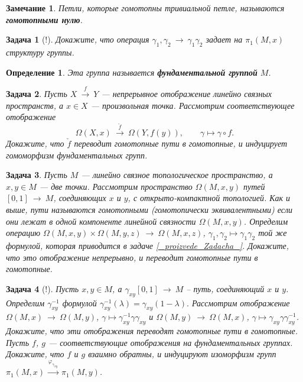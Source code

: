 \documentclass[12pt]{book}
\newcommand{\arrow}{{\:\longrightarrow\:}}
\renewcommand{\phi}{\varphi}
\theoremstyle{upshape}
\newtheorem{zadacha}{Задача}[chapter]
\theoremstyle{generic}
\newtheorem{opredelenie}[teorema]{Определение}
\theoremstyle{upshapenonumber}
\newtheorem{zamechanie}{Замечание}[chapter]
\newcommand{\следствие}{%
     \refstepcounter{teorema}
     {\noindent\bf Следствие \thechapter.\arabic{teorema}:\ }}
\newcommand{\пример}{%
     \refstepcounter{teorema}
     {\noindent\bf Пример \thechapter.\arabic{teorema}:\ }}
\newcommand{\лемма}{%
     \refstepcounter{teorema}
     {\noindent\bf Лемма \thechapter.\arabic{teorema}:\ }}
\newcommand{\теорема}{%
     \refstepcounter{teorema}
     {\noindent\bf Теорема \thechapter.\arabic{teorema}:\ }}
\newcommand{\утверждение}{%
     \refstepcounter{teorema}
     {\noindent\bf Утверждение \thechapter.\arabic{teorema}:\ }}
\begin{document}
{\begin{zamechanie}
Петли, которые гомотопны тривиальной петле, называются
{\bf гомотопными нулю}.
\end{zamechanie}

\begin{zadacha}[!]
Докажите, что операция $\gamma_1, \gamma_2\arrow \gamma_1\gamma_2$
задает на $\pi_1(M, x)$ структуру группы.
\end{zadacha}

\begin{opredelenie} 
Эта группа называется {\bf фундаментальной группой} $M$.
\end{opredelenie}

\begin{zadacha}
Пусть $X\stackrel f \arrow Y$ --- непрерывное отображение
линейно связных пространств,
а $x\in X$ --- произвольная точка. 
Рассмотрим соответствующее отображение
$$
\Omega(X, x) \overset{\check{f}}{\arrow} \Omega(Y, f(y)),
\qquad \gamma \mapsto \gamma\circ f.
$$
Докажите, что $\check f$ переводит
гомотопные пути в гомотопные,
и индуцирует гомоморфизм фундаментальных групп.
\end{zadacha}

\begin{zadacha}
Пусть $M$ --- линейно связное 
топологическое пространство, а $x, y \in M$ --- две точки.
Рассмотрим пространство $\Omega(M, x, y)$
путей $[0,1]\arrow M$, соединяющих
$x$ и $y$, с открыто-компактной топологией.
Как и выше, пути называются гомотопными
(гомотопически эквивалентными)
если они лежат в одной компоненте линейной
связности $\Omega(M, x, y)$.
Определим операцию
$\Omega(M, x, y) \times \Omega(M, y, z)\arrow \Omega(M,x, z)$,
$\gamma_1, \gamma_2 \mapsto \gamma_1\gamma_2$
той же формулой, которая приводится в задаче
\ref{_proizvede_Zadacha_}. Докажите, что
это отображение непрерывно, и переводит
гомотопные пути в гомотопные.
\end{zadacha}

\begin{zadacha}[!]
Пусть $x, y \in M$, а $\gamma_{xy}[0,1] \arrow M$ --
путь, соединяющий $x$ и $y$. Определим
$\gamma_{xy}^{-1}$ формулой 
$\gamma_{xy}^{-1}(\lambda) = \gamma_{xy}(1-\lambda).$
Рассмотрим отображение $\Omega(M,x) \arrow \Omega(M, y)$, 
$\gamma \mapsto \gamma_{xy}^{-1}\gamma \gamma_{xy}$
и $\Omega(M,y) \arrow \Omega(M, x)$, 
$\gamma \mapsto \gamma_{xy}\gamma \gamma_{xy}^{-1}$.
Докажите, что эти отображения переводят гомотопные пути
в гомотопные. Пусть $f$, $g$ --- соответствующие
отображения на фундаментальных группах.
Докажите, что $f$ и $g$ взаимно обратны, 
и индуцируют изоморфизм групп 
$\pi_1(M, x)\stackrel{\phi_{\gamma_{xy}}}\arrow \pi_1(M, y)$.
\end{zadacha}

}
\end{document}
